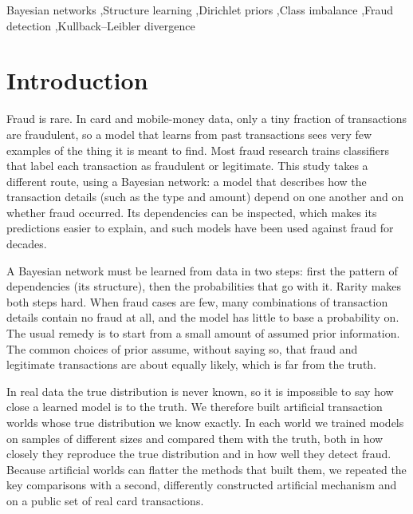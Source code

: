 \documentclass[final,5p,times,authoryear]{elsarticle}
\begin{document}
\begin{frontmatter}
\begin{keyword}
Bayesian networks \sep Structure learning \sep Dirichlet priors \sep Class imbalance \sep Fraud detection \sep Kullback--Leibler divergence
\end{keyword}

\end{frontmatter}

\section{Introduction}
Fraud is rare. In card and mobile-money data, only a tiny fraction of transactions are fraudulent, so a model that learns from past transactions sees very few examples of the thing it is meant to find. Most fraud research trains classifiers that label each transaction as fraudulent or legitimate. This study takes a different route, using a Bayesian network: a model that describes how the transaction details (such as the type and amount) depend on one another and on whether fraud occurred. Its dependencies can be inspected, which makes its predictions easier to explain, and such models have been used against fraud for decades.

A Bayesian network must be learned from data in two steps: first the pattern of dependencies (its structure), then the probabilities that go with it. Rarity makes both steps hard. When fraud cases are few, many combinations of transaction details contain no fraud at all, and the model has little to base a probability on. The usual remedy is to start from a small amount of assumed prior information. The common choices of prior assume, without saying so, that fraud and legitimate transactions are about equally likely, which is far from the truth.

In real data the true distribution is never known, so it is impossible to say how close a learned model is to the truth. We therefore built artificial transaction worlds whose true distribution we know exactly. In each world we trained models on samples of different sizes and compared them with the truth, both in how closely they reproduce the true distribution and in how well they detect fraud. Because artificial worlds can flatter the methods that built them, we repeated the key comparisons with a second, differently constructed artificial mechanism and on a public set of real card transactions.
\end{document}
